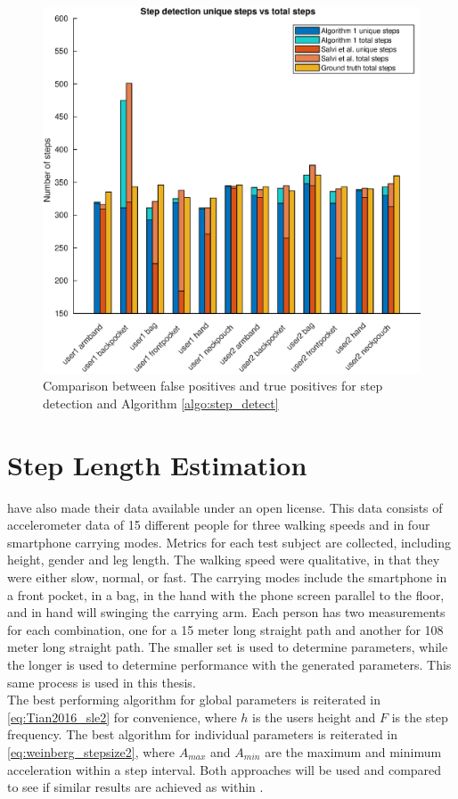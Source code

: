 \begin{figure}[H]
	\centering
	\includegraphics[width=0.7\linewidth]{images/20201112_1857_Step_detection_unique_steps_vs_total_steps_}
\caption[False positives and true positives step detection comparison]{Comparison between false positives and true positives for \citet{Salvi2018} step detection and Algorithm \ref{algo:step_detect}}
\label{fig:sd_tp_fp_comparison}
\end{figure}

\section{Step Length Estimation}

\citet{Vezocnik2019} have also made their data available under an open license. This data consists of accelerometer data of 15 different people for three walking speeds and in four smartphone carrying modes. Metrics for each test subject are collected, including height, gender and leg length. The walking speed were qualitative, in that they were either slow, normal, or fast. The carrying modes include the smartphone in a front pocket, in a bag, in the hand with the phone screen parallel to the floor, and in hand will swinging the carrying arm. Each person has two measurements for each combination, one for a 15 meter long straight path and another for 108 meter long straight path. The smaller set is used to determine parameters, while the longer is used to determine performance with the generated parameters. This same process is used in this thesis.\\
The best performing algorithm for global parameters is reiterated in \eqref{eq:Tian2016_sle2} for convenience, where $h$ is the users height and $F$ is the step frequency. The best algorithm for individual parameters is reiterated in  \eqref{eq:weinberg_stepsize2}, where $A_{max}$ and $A_{min}$ are the maximum and minimum acceleration within a step interval. Both approaches will be used and compared to see if similar results are achieved as within \cite{Vezocnik2019}.

